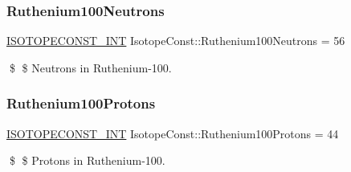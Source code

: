 \subsubsection{\texorpdfstring{Ruthenium100\+Neutrons}{Ruthenium100Neutrons}}
{\footnotesize\ttfamily \mbox{\hyperlink{group___isotope_const-_macros_ga5f18360b3e99483a35c32d789e62621c}{I\+S\+O\+T\+O\+P\+E\+C\+O\+N\+S\+T\+\_\+\+I\+NT}} Isotope\+Const\+::\+Ruthenium100\+Neutrons = 56}

\$ \$ Neutrons in Ruthenium-\/100. \mbox{\label{group___isotope_const-_ruthenium-_ru100_gaf8d54aa8e76f39b4041509f1ff419e8f}} 
\subsubsection{\texorpdfstring{Ruthenium100\+Protons}{Ruthenium100Protons}}
{\footnotesize\ttfamily \mbox{\hyperlink{group___isotope_const-_macros_ga5f18360b3e99483a35c32d789e62621c}{I\+S\+O\+T\+O\+P\+E\+C\+O\+N\+S\+T\+\_\+\+I\+NT}} Isotope\+Const\+::\+Ruthenium100\+Protons = 44}

\$ \$ Protons in Ruthenium-\/100. 